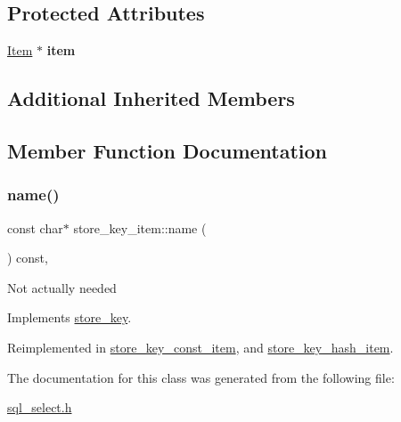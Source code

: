 \subsection*{Protected Attributes}
\begin{DoxyCompactItemize}
\item 
\mbox{\label{classstore__key__item_a73b9c42308deaaf427207cb7837d2aa4}} 
\mbox{\hyperlink{classItem}{Item}} $\ast$ {\bfseries item}
\end{DoxyCompactItemize}
\subsection*{Additional Inherited Members}


\subsection{Member Function Documentation}
\mbox{\label{classstore__key__item_a88e2baa208896dcde9ba66e9715efc3c}} 
\subsubsection{\texorpdfstring{name()}{name()}}
{\footnotesize\ttfamily const char$\ast$ store\+\_\+key\+\_\+item\+::name (\begin{DoxyParamCaption}{ }\end{DoxyParamCaption}) const\hspace{0.3cm}{\ttfamily [inline]}, {\ttfamily [virtual]}}

Not actually needed 

Implements \mbox{\hyperlink{classstore__key_a1c78dad4f3335d03b297cf30592914bf}{store\+\_\+key}}.



Reimplemented in \mbox{\hyperlink{classstore__key__const__item_a1c578851203067d4ab3c90b81d7b3cfa}{store\+\_\+key\+\_\+const\+\_\+item}}, and \mbox{\hyperlink{classstore__key__hash__item_a213002a48540add6652dfc3d908ee367}{store\+\_\+key\+\_\+hash\+\_\+item}}.



The documentation for this class was generated from the following file\+:\begin{DoxyCompactItemize}
\item 
\mbox{\hyperlink{sql__select_8h}{sql\+\_\+select.\+h}}\end{DoxyCompactItemize}

